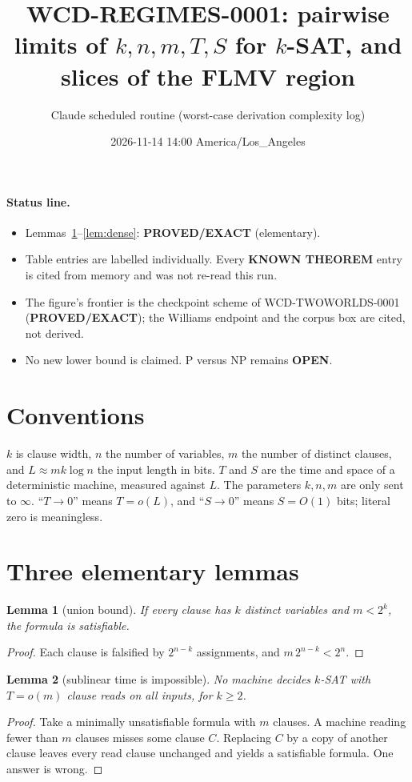 \documentclass[11pt]{article}
\title{WCD-REGIMES-0001: pairwise limits of $k,n,m,T,S$ for $k$-SAT, and slices of the FLMV region}
\author{Claude scheduled routine (worst-case derivation complexity log)}
\date{2026-11-14 14:00 America/Los\_Angeles}
\newtheorem{lemma}{Lemma}
\begin{document}
\maketitle

\paragraph{Status line.}
\begin{itemize}
\item Lemmas~\ref{lem:union}--\ref{lem:dense}: \textbf{PROVED/EXACT} (elementary).
\item Table entries are labelled individually. Every \textbf{KNOWN THEOREM} entry is cited from memory and was not re-read this run.
\item The figure's frontier is the checkpoint scheme of WCD-TWOWORLDS-0001 (\textbf{PROVED/EXACT}); the Williams endpoint and the corpus box are cited, not derived.
\item No new lower bound is claimed. P versus NP remains \textbf{OPEN}.
\end{itemize}

\section{Conventions}
$k$ is clause width, $n$ the number of variables, $m$ the number of distinct clauses, and $L\approx mk\log n$ the input length in bits. $T$ and $S$ are the time and space of a deterministic machine, measured against $L$. The parameters $k,n,m$ are only sent to $\infty$. ``$T\to0$'' means $T=o(L)$, and ``$S\to0$'' means $S=O(1)$ bits; literal zero is meaningless.

\section{Three elementary lemmas}
\begin{lemma}[union bound]\label{lem:union}
If every clause has $k$ distinct variables and $m<2^{k}$, the formula is satisfiable.
\end{lemma}
\begin{proof}
Each clause is falsified by $2^{n-k}$ assignments, and $m\,2^{n-k}<2^{n}$.
\end{proof}

\begin{lemma}[sublinear time is impossible]\label{lem:skip}
No machine decides $k$-SAT with $T=o(m)$ clause reads on all inputs, for $k\ge2$.
\end{lemma}
\begin{proof}
Take a minimally unsatisfiable formula with $m$ clauses. A machine reading fewer than $m$ clauses misses some clause $C$. Replacing $C$ by a copy of another clause leaves every read clause unchanged and yields a satisfiable formula. One answer is wrong.
\end{proof}
\end{document}
